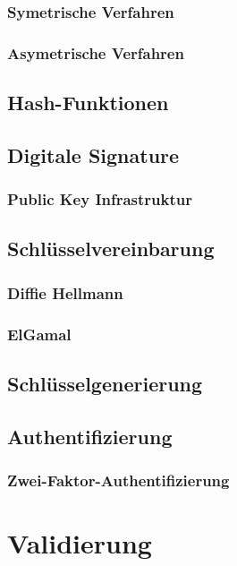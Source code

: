 \documentclass[10pt, a4paper]{scrreprt}
\begin{document}
\subsection{Symetrische Verfahren}
\subsection{Asymetrische Verfahren}

\section{Hash-Funktionen}
\section{Digitale Signature}
\subsection{Public Key Infrastruktur}
\section{Schlüsselvereinbarung}
\subsection{Diffie Hellmann}
\subsection{ElGamal}
\section{Schlüsselgenerierung}
\section{Authentifizierung}
\subsection{Zwei-Faktor-Authentifizierung}


\chapter{Validierung}
\end{document}
